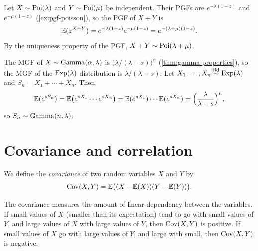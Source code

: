 \begin{example}\label{ex:sum-poisson-pgf}
Let $X \sim \mathrm{Poi}(\lambda)$ and $Y \sim \mathrm{Poi}(\mu)$ be independent. Their PGFs are $e^{-\lambda(1-z)}$ and $e^{-\mu(1-z)}$ (\cref{ex:pgf-poisson}), so the PGF of $X + Y$ is
\[
  \operatorname{\mathbb{E}}(z^{X+Y}) = e^{-\lambda(1-z)} e^{-\mu(1-z)} = e^{-(\lambda + \mu)(1-z)}.
\]
By the uniqueness property of the PGF, $X + Y \sim \mathrm{Poi}(\lambda + \mu)$.
\end{example}

\begin{example}\label{ex:sum-exponential-mgf}
The MGF of $X \sim \mathrm{Gamma}(\alpha, \lambda)$ is $\bigl(\lambda/(\lambda - s)\bigr)^\alpha$ (\cref{thm:gamma-properties}), so the MGF of the $\mathrm{Exp}(\lambda)$ distribution is $\lambda/(\lambda - s)$. Let $X_1, \ldots, X_n \overset{\text{iid}}{\sim} \mathrm{Exp}(\lambda)$ and $S_n = X_1 + \cdots + X_n$. Then
\[
  \operatorname{\mathbb{E}}(e^{sS_n}) = \operatorname{\mathbb{E}}\bigl(e^{sX_1} \cdots e^{sX_n}\bigr) = \operatorname{\mathbb{E}}(e^{sX_1}) \cdots \operatorname{\mathbb{E}}(e^{sX_n}) = \Bigl(\frac{\lambda}{\lambda - s}\Bigr)^n,
\]
so $S_n \sim \mathrm{Gamma}(n, \lambda)$.
\end{example}

\section{Covariance and correlation}\label{sec:covariance}

\begin{definition}[Covariance]\label{def:covariance}
We define the \emph{covariance} of two random variables $X$ and $Y$ by
\[
  \operatorname{Cov}(X, Y) = \operatorname{\mathbb{E}}\bigl((X - \operatorname{\mathbb{E}}(X))(Y - \operatorname{\mathbb{E}}(Y))\bigr).
\]
\end{definition}

The covariance measures the amount of linear dependency between the variables. If small values of $X$ (smaller than its expectation) tend to go with small values of $Y$, and large values of $X$ with large values of $Y$, then $\operatorname{Cov}(X, Y)$ is positive. If small values of $X$ go with large values of $Y$, and large with small, then $\operatorname{Cov}(X, Y)$ is negative.

